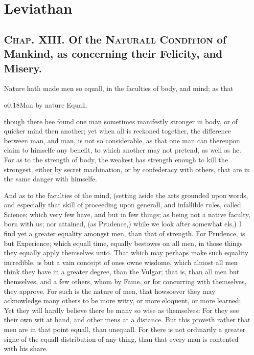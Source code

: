 
\author{Thomas Hobbes}
\chapter[Leviathan, chaps. 13 and 17]{Leviathan}

\section*{\textsc{Chap}. XIII. Of the \textsc{Naturall
Condition} of Mankind, as concerning their Felicity, and Misery.}


Nature hath made men so equall, in the faculties of body, and mind; as
that \begin{wrapfigure}[4]{o}{0.18\textwidth}\wrapadj Man by nature
Equall. \end{wrapfigure} though there bee found one man sometimes
manifestly stronger in body, or of quicker mind then another; yet when
all is reckoned together, the difference between man, and man, is not
so considerable, as that one man can thereupon claim to himselfe any
benefit, to which another may not pretend, as well as he. For as to
the strength of body, the weakest has strength enough to kill the
strongest, either by secret machination, or by confederacy with
others, that are in the same danger with himselfe.

And as to the faculties of the mind, (setting aside the arts
grounded upon words, and especially that skill of proceeding upon
generall, and infallible rules, called Science; which very few have,
and but in few things; as being not a native faculty, born with us;
nor attained, (as Prudence,) while we look after somewhat els,) I find
yet a greater equality amongst men, than that of strength. For
Prudence, is but Experience; which equall time, equally bestowes on
all men, in those things they equally apply themselves unto. That
which may perhaps make such equality incredible, is but a vain
conceipt of ones owne wisdome, which almost all men think they have
in a greater degree, than the Vulgar; that is, than all men but
themselves, and a few others, whom by Fame, or for concurring with
themselves, they approve. For such is the nature of men, that
howsoever they may acknowledge many others to be more witty, or more
eloquent, or more learned; Yet they will hardly believe there be many
so wise as themselves: For they see their own wit at hand, and other
mens at a distance. But this proveth rather that men are in that
point equall, than unequall. For there is not ordinarily a greater
signe of the equall distribution of any thing, than that every man is
contented with his share.

